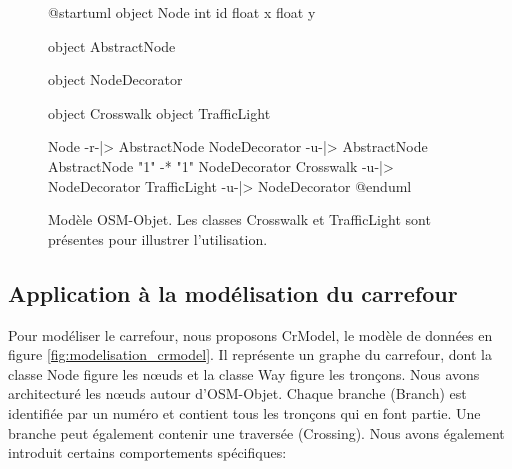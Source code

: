 \begin{figure}[ht]
    \centering
    \begin{plantuml}
    
        @startuml
        object Node {
            int id
            float x
            float y
        }
    
        object AbstractNode
    
        object NodeDecorator
    
        object Crosswalk
        object TrafficLight
    
        Node -r-|> AbstractNode
        NodeDecorator -u-|> AbstractNode
        AbstractNode "1" -* "1" NodeDecorator
        Crosswalk -u-|> NodeDecorator
        TrafficLight -u-|> NodeDecorator
        @enduml
        
    \end{plantuml}
    \caption[Modèle OSM-Objet.]{Modèle OSM-Objet. Les classes Crosswalk et TrafficLight sont présentes pour illustrer l'utilisation.}
    \label{fig:modelisation_osm_objet}
\end{figure}

\subsection{Application à la modélisation du carrefour}

\label{sec:modelisation_crmodel}

Pour modéliser le carrefour, nous proposons CrModel, le modèle de données en figure \ref{fig:modelisation_crmodel}. Il représente un graphe du carrefour, dont la classe Node figure les nœuds et la classe Way figure les tronçons. Nous avons architecturé les nœuds autour d'OSM-Objet. Chaque branche (Branch) est identifiée par un numéro et contient tous les tronçons qui en font partie. Une  branche peut également contenir une traversée (Crossing). Nous avons également introduit certains comportements spécifiques:


